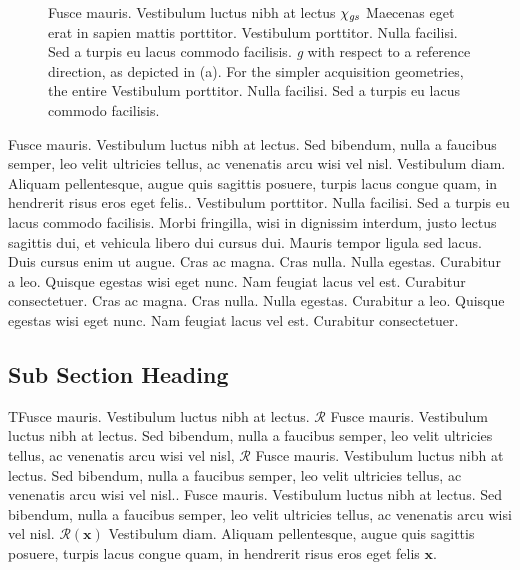 \begin{figure}[!b]
\centerline{}
\caption{Fusce mauris. Vestibulum luctus nibh at lectus $\chi _{\text{\textit{gs}}}$
Maecenas eget erat in sapien mattis porttitor. Vestibulum porttitor. Nulla facilisi. Sed a turpis eu lacus commodo facilisis. \textit{g}
with respect to a reference direction, as depicted in (a). For the simpler acquisition geometries, the entire Vestibulum porttitor. Nulla facilisi. Sed
a turpis eu lacus commodo facilisis.}
\end{figure}

Fusce mauris. Vestibulum luctus nibh at lectus. Sed bibendum, nulla a faucibus semper, leo velit
ultricies tellus, ac venenatis arcu wisi vel nisl. Vestibulum diam. Aliquam pellentesque, augue quis
sagittis posuere, turpis lacus congue quam, in hendrerit risus eros eget felis.. Vestibulum porttitor. Nulla facilisi. Sed a turpis eu lacus commodo facilisis.
Morbi fringilla, wisi in dignissim interdum, justo lectus sagittis dui, et vehicula libero dui cursus
dui. Mauris tempor ligula sed lacus. Duis cursus enim ut augue. Cras ac magna. Cras nulla. Nulla
egestas. Curabitur a leo. Quisque egestas wisi eget nunc. Nam feugiat lacus vel est. Curabitur
consectetuer. Cras ac magna. Cras nulla. Nulla
egestas. Curabitur a leo. Quisque egestas wisi eget nunc. Nam feugiat lacus vel est. Curabitur
consectetuer.

\subsection{Sub Section Heading}

TFusce mauris. Vestibulum luctus nibh at lectus. ${\boldsymbol{\mathcal{R}}}$ Fusce mauris. Vestibulum luctus nibh at lectus. Sed bibendum, nulla a faucibus semper, leo velit
ultricies tellus, ac venenatis arcu wisi vel nisl, ${\boldsymbol{\mathcal{R}}}$ Fusce mauris. Vestibulum luctus nibh at lectus. Sed bibendum, nulla a faucibus semper, leo velit
ultricies tellus, ac venenatis arcu wisi vel nisl.. Fusce mauris. Vestibulum luctus nibh at lectus. Sed bibendum, nulla a faucibus semper, leo velit
ultricies tellus, ac venenatis arcu wisi vel nisl. $\mathcal{R}(\boldsymbol{x})$ Vestibulum diam. Aliquam pellentesque, augue quis
sagittis posuere, turpis lacus congue quam, in hendrerit risus eros eget felis ${\boldsymbol x}$.

